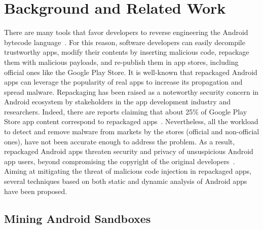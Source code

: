 \section{Background and Related Work}\label{sec:background}


There are many tools that favor developers to reverse engineering the Android bytecode language~\cite{DBLP:conf/issta/WangGMC15}.
For this reason, software developers can easily decompile trustworthy apps, modify their contents by inserting malicious code,
repackage them with malicious payloads, and re-publish them in app stores, including official ones like the Google Play Store.
It is well-known that repackaged Android apps can leverage the popularity of real apps to increase its propagation and spread malware.  
Repackaging has been raised as a noteworthy security concern in Android ecosystem by stakeholders in the app development industry and researchers. Indeed, there are reports claiming that about 25\% of Google Play Store app content correspond to repackaged apps~\cite{DBLP:conf/sigmetrics/ViennotGN14}. Nevertheless, all the workload to detect and remove malware from markets by the stores (official and non-official ones), have not been accurate enough to address the problem. As a result, repackaged Android apps threaten security and privacy of unsuspicious Android app users, beyond compromising the copyright of the original developers~\cite{DBLP:journals/access/KimLCP19}. Aiming at
mitigating the threat of malicious code injection in repackaged apps,
several techniques based on both static and dynamic analysis of Android apps have been proposed.

\subsection{Mining Android Sandboxes}\label{sec:android-sandbox}

